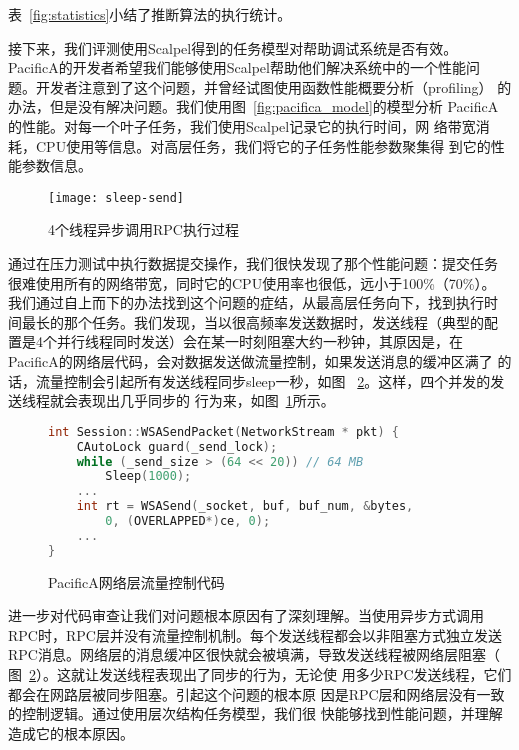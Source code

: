 表~\ref{fig:statistics}小结了推断算法的执行统计。

接下来，我们评测使用Scalpel得到的任务模型对帮助调试系统是否有效。
PacificA的开发者希望我们能够使用Scalpel帮助他们解决系统中的一个性能问
题。开发者注意到了这个问题，并曾经试图使用函数性能概要分析（profiling）
的办法，但是没有解决问题。我们使用图~\ref{fig:pacifica_model}的模型分析
PacificA的性能。对每一个叶子任务，我们使用Scalpel记录它的执行时间，网
络带宽消耗，CPU使用等信息。对高层任务，我们将它的子任务性能参数聚集得
到它的性能参数信息。

\begin{figure}[htbp]
  \centering
  \begin{minipage}{0.8\linewidth}
    \centering
    \texttt{[image: sleep-send]}
    \caption{4个线程异步调用RPC执行过程}
    \label{fig:sleep-send}
  \end{minipage}
\end{figure}


通过在压力测试中执行数据提交操作，我们很快发现了那个性能问题：提交任务
很难使用所有的网络带宽，同时它的CPU使用率也很低，远小于100\%（70\%）。
我们通过自上而下的办法找到这个问题的症结，从最高层任务向下，找到执行时
间最长的那个任务。我们发现，当以很高频率发送数据时，发送线程（典型的配
置是4个并行线程同时发送）会在某一时刻阻塞大约一秒钟，其原因是，在
PacificA的网络层代码，会对数据发送做流量控制，如果发送消息的缓冲区满了
的话，流量控制会引起所有发送线程同步sleep一秒，如图~
\ref{fig:flow_control_code}。这样，四个并发的发送线程就会表现出几乎同步的
行为来，如图~\ref{fig:sleep-send}所示。

\begin{figure}[htbp]
\centering
\begin{lstlisting}[language=C++]
int Session::WSASendPacket(NetworkStream * pkt) {    
    CAutoLock guard(_send_lock);
    while (_send_size > (64 << 20)) // 64 MB
        Sleep(1000);
    ...
    int rt = WSASend(_socket, buf, buf_num, &bytes,
        0, (OVERLAPPED*)ce, 0);
    ...
}
\end{lstlisting}
\caption{PacificA网络层流量控制代码}
\label{fig:flow_control_code}
\end{figure}


进一步对代码审查让我们对问题根本原因有了深刻理解。当使用异步方式调用
RPC时，RPC层并没有流量控制机制。每个发送线程都会以非阻塞方式独立发送
RPC消息。网络层的消息缓冲区很快就会被填满，导致发送线程被网络层阻塞（
图~\ref{fig:flow_control_code}）。这就让发送线程表现出了同步的行为，无论使
用多少RPC发送线程，它们都会在网路层被同步阻塞。引起这个问题的根本原
因是RPC层和网络层没有一致的控制逻辑。通过使用层次结构任务模型，我们很
快能够找到性能问题，并理解造成它的根本原因。

